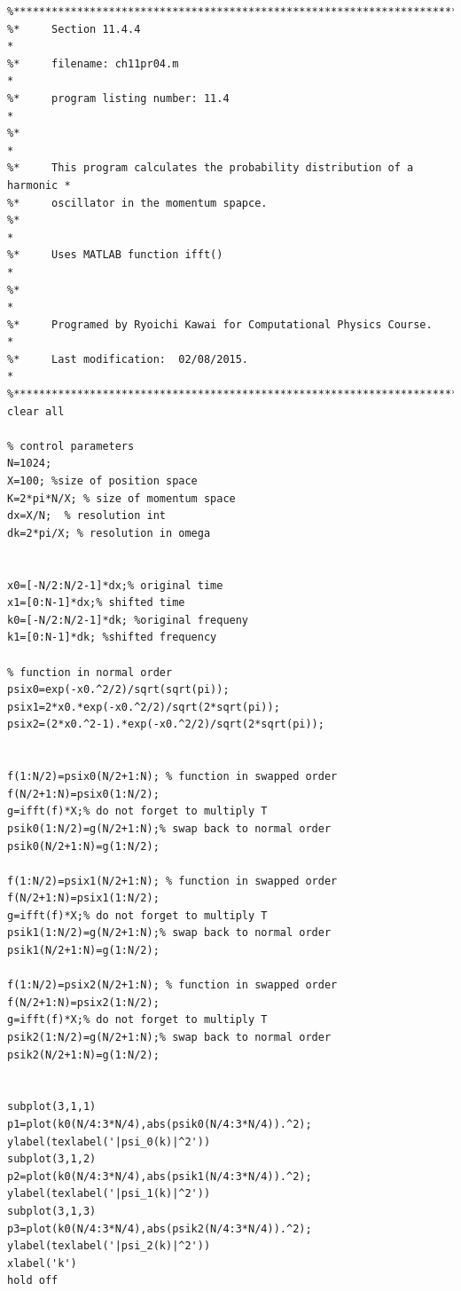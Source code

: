 \bigskip
\noindent
\program
\label{prog:fft_powerspectrum}
\footnotesize
\begin{verbatim}
%**************************************************************************
%*     Section 11.4.4                                                     *
%*     filename: ch11pr04.m                                               *
%*     program listing number: 11.4                                       *
%*                                                                        *
%*     This program calculates the probability distribution of a harmonic *
%*     oscillator in the momentum spapce.
%*                                                                        *
%*     Uses MATLAB function ifft()                                        *
%*                                                                        *
%*     Programed by Ryoichi Kawai for Computational Physics Course.       *
%*     Last modification:  02/08/2015.                                    *
%**************************************************************************
clear all

% control parameters
N=1024;
X=100; %size of position space
K=2*pi*N/X; % size of momentum space
dx=X/N;  % resolution int
dk=2*pi/X; % resolution in omega


x0=[-N/2:N/2-1]*dx;% original time
x1=[0:N-1]*dx;% shifted time
k0=[-N/2:N/2-1]*dk; %original frequeny 
k1=[0:N-1]*dk; %shifted frequency

% function in normal order
psix0=exp(-x0.^2/2)/sqrt(sqrt(pi));
psix1=2*x0.*exp(-x0.^2/2)/sqrt(2*sqrt(pi));
psix2=(2*x0.^2-1).*exp(-x0.^2/2)/sqrt(2*sqrt(pi));


f(1:N/2)=psix0(N/2+1:N); % function in swapped order
f(N/2+1:N)=psix0(1:N/2);
g=ifft(f)*X;% do not forget to multiply T
psik0(1:N/2)=g(N/2+1:N);% swap back to normal order
psik0(N/2+1:N)=g(1:N/2);

f(1:N/2)=psix1(N/2+1:N); % function in swapped order
f(N/2+1:N)=psix1(1:N/2);
g=ifft(f)*X;% do not forget to multiply T
psik1(1:N/2)=g(N/2+1:N);% swap back to normal order
psik1(N/2+1:N)=g(1:N/2);

f(1:N/2)=psix2(N/2+1:N); % function in swapped order
f(N/2+1:N)=psix2(1:N/2);
g=ifft(f)*X;% do not forget to multiply T
psik2(1:N/2)=g(N/2+1:N);% swap back to normal order
psik2(N/2+1:N)=g(1:N/2);


subplot(3,1,1)
p1=plot(k0(N/4:3*N/4),abs(psik0(N/4:3*N/4)).^2);
ylabel(texlabel('|psi_0(k)|^2'))
subplot(3,1,2)
p2=plot(k0(N/4:3*N/4),abs(psik1(N/4:3*N/4)).^2);
ylabel(texlabel('|psi_1(k)|^2'))
subplot(3,1,3)
p3=plot(k0(N/4:3*N/4),abs(psik2(N/4:3*N/4)).^2);
ylabel(texlabel('|psi_2(k)|^2'))
xlabel('k')
hold off
\end{verbatim}
\normalsize

